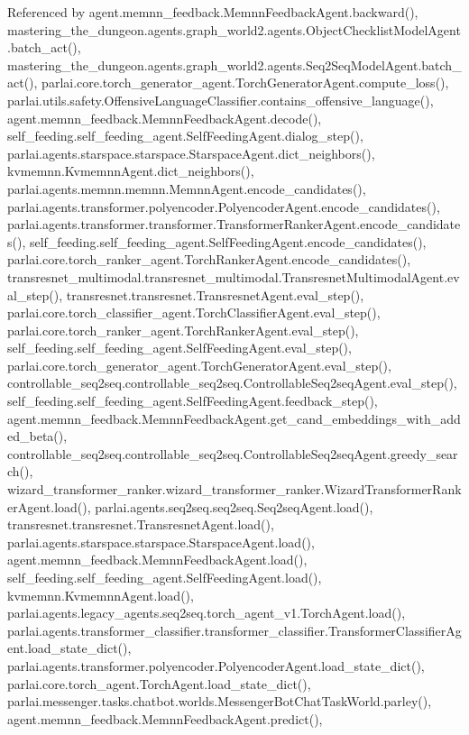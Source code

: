 Referenced by agent.\+memnn\+\_\+feedback.\+Memnn\+Feedback\+Agent.\+backward(), mastering\+\_\+the\+\_\+dungeon.\+agents.\+graph\+\_\+world2.\+agents.\+Object\+Checklist\+Model\+Agent.\+batch\+\_\+act(), mastering\+\_\+the\+\_\+dungeon.\+agents.\+graph\+\_\+world2.\+agents.\+Seq2\+Seq\+Model\+Agent.\+batch\+\_\+act(), parlai.\+core.\+torch\+\_\+generator\+\_\+agent.\+Torch\+Generator\+Agent.\+compute\+\_\+loss(), parlai.\+utils.\+safety.\+Offensive\+Language\+Classifier.\+contains\+\_\+offensive\+\_\+language(), agent.\+memnn\+\_\+feedback.\+Memnn\+Feedback\+Agent.\+decode(), self\+\_\+feeding.\+self\+\_\+feeding\+\_\+agent.\+Self\+Feeding\+Agent.\+dialog\+\_\+step(), parlai.\+agents.\+starspace.\+starspace.\+Starspace\+Agent.\+dict\+\_\+neighbors(), kvmemnn.\+Kvmemnn\+Agent.\+dict\+\_\+neighbors(), parlai.\+agents.\+memnn.\+memnn.\+Memnn\+Agent.\+encode\+\_\+candidates(), parlai.\+agents.\+transformer.\+polyencoder.\+Polyencoder\+Agent.\+encode\+\_\+candidates(), parlai.\+agents.\+transformer.\+transformer.\+Transformer\+Ranker\+Agent.\+encode\+\_\+candidates(), self\+\_\+feeding.\+self\+\_\+feeding\+\_\+agent.\+Self\+Feeding\+Agent.\+encode\+\_\+candidates(), parlai.\+core.\+torch\+\_\+ranker\+\_\+agent.\+Torch\+Ranker\+Agent.\+encode\+\_\+candidates(), transresnet\+\_\+multimodal.\+transresnet\+\_\+multimodal.\+Transresnet\+Multimodal\+Agent.\+eval\+\_\+step(), transresnet.\+transresnet.\+Transresnet\+Agent.\+eval\+\_\+step(), parlai.\+core.\+torch\+\_\+classifier\+\_\+agent.\+Torch\+Classifier\+Agent.\+eval\+\_\+step(), parlai.\+core.\+torch\+\_\+ranker\+\_\+agent.\+Torch\+Ranker\+Agent.\+eval\+\_\+step(), self\+\_\+feeding.\+self\+\_\+feeding\+\_\+agent.\+Self\+Feeding\+Agent.\+eval\+\_\+step(), parlai.\+core.\+torch\+\_\+generator\+\_\+agent.\+Torch\+Generator\+Agent.\+eval\+\_\+step(), controllable\+\_\+seq2seq.\+controllable\+\_\+seq2seq.\+Controllable\+Seq2seq\+Agent.\+eval\+\_\+step(), self\+\_\+feeding.\+self\+\_\+feeding\+\_\+agent.\+Self\+Feeding\+Agent.\+feedback\+\_\+step(), agent.\+memnn\+\_\+feedback.\+Memnn\+Feedback\+Agent.\+get\+\_\+cand\+\_\+embeddings\+\_\+with\+\_\+added\+\_\+beta(), controllable\+\_\+seq2seq.\+controllable\+\_\+seq2seq.\+Controllable\+Seq2seq\+Agent.\+greedy\+\_\+search(), wizard\+\_\+transformer\+\_\+ranker.\+wizard\+\_\+transformer\+\_\+ranker.\+Wizard\+Transformer\+Ranker\+Agent.\+load(), parlai.\+agents.\+seq2seq.\+seq2seq.\+Seq2seq\+Agent.\+load(), transresnet.\+transresnet.\+Transresnet\+Agent.\+load(), parlai.\+agents.\+starspace.\+starspace.\+Starspace\+Agent.\+load(), agent.\+memnn\+\_\+feedback.\+Memnn\+Feedback\+Agent.\+load(), self\+\_\+feeding.\+self\+\_\+feeding\+\_\+agent.\+Self\+Feeding\+Agent.\+load(), kvmemnn.\+Kvmemnn\+Agent.\+load(), parlai.\+agents.\+legacy\+\_\+agents.\+seq2seq.\+torch\+\_\+agent\+\_\+v1.\+Torch\+Agent.\+load(), parlai.\+agents.\+transformer\+\_\+classifier.\+transformer\+\_\+classifier.\+Transformer\+Classifier\+Agent.\+load\+\_\+state\+\_\+dict(), parlai.\+agents.\+transformer.\+polyencoder.\+Polyencoder\+Agent.\+load\+\_\+state\+\_\+dict(), parlai.\+core.\+torch\+\_\+agent.\+Torch\+Agent.\+load\+\_\+state\+\_\+dict(), parlai.\+messenger.\+tasks.\+chatbot.\+worlds.\+Messenger\+Bot\+Chat\+Task\+World.\+parley(), agent.\+memnn\+\_\+feedback.\+Memnn\+Feedback\+Agent.\+predict(), 